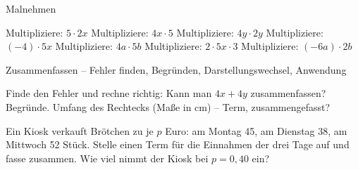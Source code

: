 \begin{aufgabe}{Malnehmen}
\begin{teile}
\teil Multipliziere: $5 \cdot 2x$ \leerfeld
\teil Multipliziere: $4x \cdot 5$ \leerfeld
\teil Multipliziere: $4y \cdot 2y$ \leerfeld
\teil Multipliziere: $(-4) \cdot 5x$ \leerfeld
\teil Multipliziere: $4a \cdot 5b$ \leerfeld
\teil Multipliziere: $2 \cdot 5x \cdot 3$ \leerfeld
\teil Multipliziere: $(-6a) \cdot 2b$ \leerfeld
\end{teile}
\end{aufgabe}

\begin{aufgabe}{Zusammenfassen – Fehler finden, Begründen, Darstellungswechsel, Anwendung}
\begin{teile}
\teil Finde den Fehler und rechne richtig: 
\teil Kann man $4x + 4y$ zusammenfassen? Begründe.
\teil Umfang des Rechtecks (Maße in cm) – Term, zusammengefasst?

\leerfeld
\teil Ein Kiosk verkauft Brötchen zu je $p$ Euro: am Montag 45, am Dienstag 38, am Mittwoch 52 Stück. Stelle einen Term für die Einnahmen der drei Tage auf und fasse zusammen. Wie viel nimmt der Kiosk bei $p = 0{,}40$ ein?
\end{teile}
\end{aufgabe}
